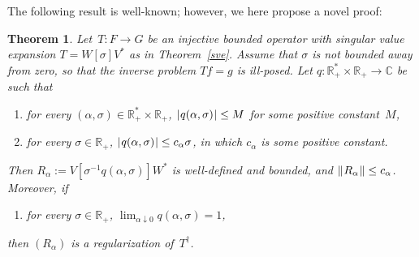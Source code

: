 \documentclass[a4paper]{article}
\newtheorem{theorem}{Theorem}
\def\Ce{\mathds{C}}
\def\Re{\mathds{R}}
\def\mod#1{|\mskip 1mu #1 \mskip 1mu|}
\def\norm#1{\| \mskip 1mu #1 \mskip 1mu \|}
\begin{document}
The following result is well-known; however, we here propose a novel proof:
\begin{theorem}\sf
\label{spectral-reg}
Let~$T\colon F\to G$ be an injective bounded operator with
singular value expansion $T=W[\sigma]V^*$ as in Theorem~\ref{sve}.
Assume that $\sigma$ is not bounded away from zero, so that the
inverse problem $Tf=g$ is ill-posed.
Let $q\colon\Re_+^*\times\Re_+\to\Ce$ be such that
\begin{enumerate}
\item[(A1)]
for every $(\alpha,\sigma)\in\Re_+^*\times\Re_+$, 
$\mod{q(\alpha,\sigma)}\leq M$ for some positive constant~$M$,
\item[(A2)]
for every $\sigma\in\Re_+$, $\mod{q(\alpha,\sigma)}\leq c_\alpha\sigma$,
in which $c_\alpha$ is some positive constant.
\end{enumerate}
Then $R_\alpha:= V[\sigma^{-1}q(\alpha,\sigma)]W^*$ is well-defined and bounded,
and $\norm{R_\alpha}\leq c_\alpha$.
Moreover, if
\begin{enumerate}
\item[(A3)]
for every $\sigma\in\Re_+$,
$\lim_{\alpha\downarrow 0}q(\alpha,\sigma)=1$,
\end{enumerate}
then $(R_\alpha)$ is a regularization of~$T^\dagger$.
\end{theorem}
\end{document}
